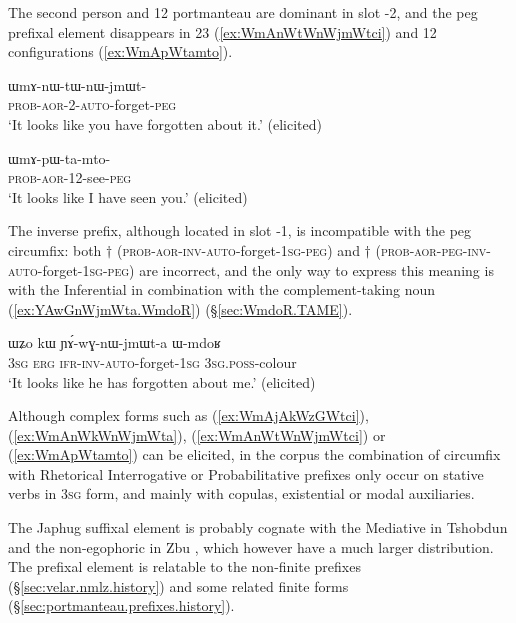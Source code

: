 The second person  and 1\fl{}2 portmanteau  are dominant in slot -2, and the peg prefixal element   disappears in 2\fl{}3 (\ref{ex:WmAnWtWnWjmWtci}) and 1\fl{}2 configurations (\ref{ex:WmApWtamto}).  

\begin{exe}
\ex \label{ex:WmAnWtWnWjmWtci}
\gll ɯmɤ-nɯ-tɯ-nɯ-jmɯt- \\
\textsc{prob}-\textsc{aor}-2-\textsc{auto}-forget-\textsc{peg} \\
\glt `It looks like you have forgotten about it.' (elicited)
\end{exe}

\begin{exe}
\ex \label{ex:WmApWtamto}
\gll ɯmɤ-pɯ-ta-mto-  \\
\textsc{prob}-\textsc{aor}-1\fl{}2-see-\textsc{peg} \\
\glt `It looks like I have seen you.' (elicited)
\end{exe}

The inverse prefix, although located in slot -1, is incompatible with the peg circumfix: both $\dagger$ (\textsc{prob}-\textsc{aor}-\textsc{inv}-\textsc{auto}-forget-\textsc{1sg}-\textsc{peg}) and $\dagger$ (\textsc{prob}-\textsc{aor}-\textsc{peg}-\textsc{inv}-\textsc{auto}-forget-\textsc{1sg}-\textsc{peg}) are incorrect, and the only way to express this meaning is with the Inferential in combination with the com\-ple\-ment-taking noun  (\ref{ex:YAwGnWjmWta.WmdoR}) (§\ref{sec:WmdoR.TAME}).

\begin{exe}
\ex \label{ex:YAwGnWjmWta.WmdoR}
\gll ɯʑo kɯ ɲɤ́-wɣ-nɯ-jmɯt-a ɯ-mdoʁ \\
 \textsc{3sg} \textsc{erg} \textsc{ifr}-\textsc{inv}-\textsc{auto}-forget-\textsc{1sg} \textsc{3sg}.\textsc{poss}-colour  \\
\glt `It looks like he has forgotten about me.' (elicited)
\end{exe}

Although complex forms such as (\ref{ex:WmAjAkWzGWtci}), (\ref{ex:WmAnWkWnWjmWta}), (\ref{ex:WmAnWtWnWjmWtci}) or (\ref{ex:WmApWtamto}) can be elicited, in the corpus the combination of circumfix with Rhetorical Interrogative or Probabilitative prefixes only occur on stative verbs in \textsc{3sg} form, and mainly with copulas, existential or modal auxiliaries.

The Japhug  suffixal element is probably cognate with the Mediative  in Tshobdun \citep{jackson17tshobdun} and the non-egophoric  in Zbu \citep{gong18these}, which however have a much larger distribution. The  prefixal element is relatable to the non-finite  prefixes (§\ref{sec:velar.nmlz.history}) and some related finite forms (§\ref{sec:portmanteau.prefixes.history}).

